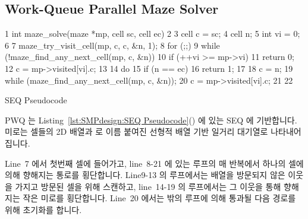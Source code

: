 \subsection{Work-Queue Parallel Maze Solver}
\label{sec:SMPdesign:Work-Queue Parallel Maze Solver}

\begin{listing}[tbp]
{ \scriptsize
\begin{verbbox}
  1 int maze_solve(maze *mp, cell sc, cell ec)
  2 {
  3   cell c = sc;
  4   cell n;
  5   int vi = 0;
  6 
  7   maze_try_visit_cell(mp, c, c, &n, 1);
  8   for (;;) {
  9     while (!maze_find_any_next_cell(mp, c, &n)) {
 10       if (++vi >= mp->vi)
 11         return 0;
 12       c = mp->visited[vi].c;
 13     }
 14     do {
 15       if (n == ec) {
 16         return 1;
 17       }
 18       c = n;
 19     } while (maze_find_any_next_cell(mp, c, &n));
 20     c = mp->visited[vi].c;
 21   }
 22 }
\end{verbbox}
}
\centering
\theverbbox
\caption{SEQ Pseudocode}
\label{lst:SMPdesign:SEQ Pseudocode}
\end{listing}

PWQ 는 Listing~\ref{lst:SMPdesign:SEQ Pseudocode}() 에 있는
SEQ 에 기반합니다.
미로는 셀들의 2D 배열과  로 이름 붙여진 선형적 배열 기반 일거리
대기열로 나타내어집니다.

Line~7 에서 첫번째 셀에 들어가고, line~8-21 에 있는 루프의 매 반복에서 하나의
셀에 의해 향해지는 통로를 횡단합니다.
Line9-13 의 루프에서는  배열을 방문되지 않은 이웃을 가지고
방문된 셀을 위해 스캔하고, line~14-19 의 루프에서는 그 이웃을 통해 향해지는
작은 미로를 횡단합니다.
Line~20 에서는 밖의 루프에 의해 통과될 다음 경로를 위해 초기화를 합니다.

